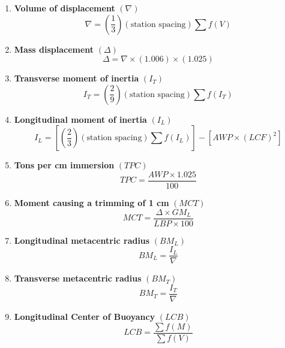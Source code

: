 \documentclass[12pt,a4paper,twoside]{report}
\begin{document}
\begin{enumerate}[\alph*)]

\item \textbf{Volume of displacement} $(\nabla)$
\begin{equation}
\nabla =
\left(\frac{1}{3}\right)
(\text{station spacing})
\sum f(V)
\end{equation}

\item \textbf{Mass displacement} $(\Delta)$
\begin{equation}
\Delta = \nabla \times (1.006) \times (1.025)
\end{equation}

\item \textbf{Transverse moment of inertia} $(I_T)$
\begin{equation}
I_T =
\left(\frac{2}{9}\right)
(\text{station spacing})
\sum f(I_T)
\end{equation}

\item \textbf{Longitudinal moment of inertia} $(I_L)$
\begin{equation}
I_L =
\left[
\left(\frac{2}{3}\right)
(\text{station spacing})
\sum f(I_L)
\right]
-
\left[AWP \times (LCF)^2\right]
\end{equation}

\item \textbf{Tons per cm immersion} $(TPC)$
\begin{equation}
TPC =
\frac{AWP \times 1.025}{100}
\end{equation}

\item \textbf{Moment causing a trimming of 1 cm} $(MCT)$
\begin{equation}
MCT =
\frac{\Delta \times {GM_L}}{LBP \times 100}
\end{equation}

\item \textbf{Longitudinal metacentric radius} $(BM_L)$
\begin{equation}
BM_L = \frac{I_L}{\nabla}
\end{equation}

\item \textbf{Transverse metacentric radius} $(BM_T)$
\begin{equation}
BM_T = \frac{I_T}{\nabla}
\end{equation}

\item \textbf{Longitudinal Center of Buoyancy} $(LCB)$
\begin{equation}
LCB = \frac{\sum f(M)}{\sum f(V)}
\end{equation}


\end{enumerate}
\end{document}
